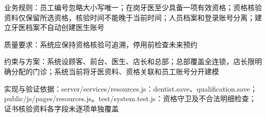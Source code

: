\documentclass[UTF8,12pt,a4paper,fontset=none]{ctexart}
\begin{document}
业务规则：员工编号忽略大小写唯一；在岗牙医至少具备一项有效资格；资格核验资料仅保留所选资格，核验时间不能晚于当前时间；人员档案和登录账号分离；建立牙医档案不自动创建医生账号\par
质量要求：系统应保持资格核验可追溯，停用前检查未来预约\par
约束与方案：系统设顾客、前台、医生、店长和总部；总部覆盖全连锁，店长限明确分配的门诊；系统当前将牙医资料、资格关联和员工账号分开建模\par
实现与验证依据：server/\allowbreak{}services/\allowbreak{}resources.\allowbreak{}js：dentist.\allowbreak{}save、qualification.\allowbreak{}save；public/\allowbreak{}js/\allowbreak{}pages/\allowbreak{}resources.\allowbreak{}js。test/\allowbreak{}system.\allowbreak{}test.\allowbreak{}js：资格守卫及不合法明细检查；证书核验资料各字段未逐项单独覆盖\par
{}
\end{document}

